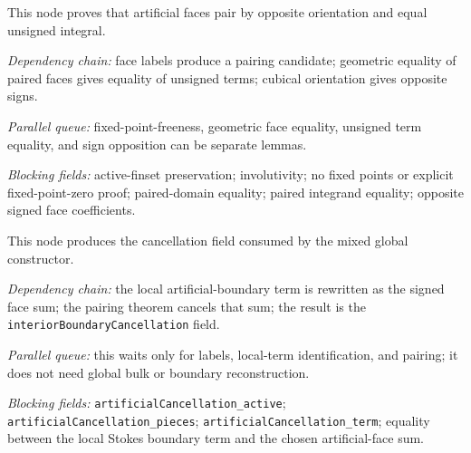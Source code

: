 \begin{lemma}
  \label{obl:m7_artificial_face_pairing}
  This node proves that artificial faces pair by opposite orientation and equal
  unsigned integral.

  \emph{Dependency chain:}
  face labels produce a pairing candidate; geometric equality of paired faces
  gives equality of unsigned terms; cubical orientation gives opposite signs.

  \emph{Parallel queue:}
  fixed-point-freeness, geometric face equality, unsigned term equality, and
  sign opposition can be separate lemmas.

  \emph{Blocking fields:}
  active-finset preservation; involutivity; no fixed points or explicit
  fixed-point-zero proof; paired-domain equality; paired integrand equality;
  opposite signed face coefficients.
\end{lemma}

\begin{theorem}
  \label{obl:m7_artificial_boundary_cancellation}
  This node produces the cancellation field consumed by the mixed global
  constructor.

  \emph{Dependency chain:}
  the local artificial-boundary term is rewritten as the signed face sum; the
  pairing theorem cancels that sum; the result is the
  \texttt{interiorBoundaryCancellation} field.

  \emph{Parallel queue:}
  this waits only for labels, local-term identification, and pairing; it does
  not need global bulk or boundary reconstruction.

  \emph{Blocking fields:}
  \texttt{artificialCancellation\_active};
  \texttt{artificialCancellation\_pieces};
  \texttt{artificialCancellation\_term}; equality between the local Stokes
  boundary term and the chosen artificial-face sum.
\end{theorem}

